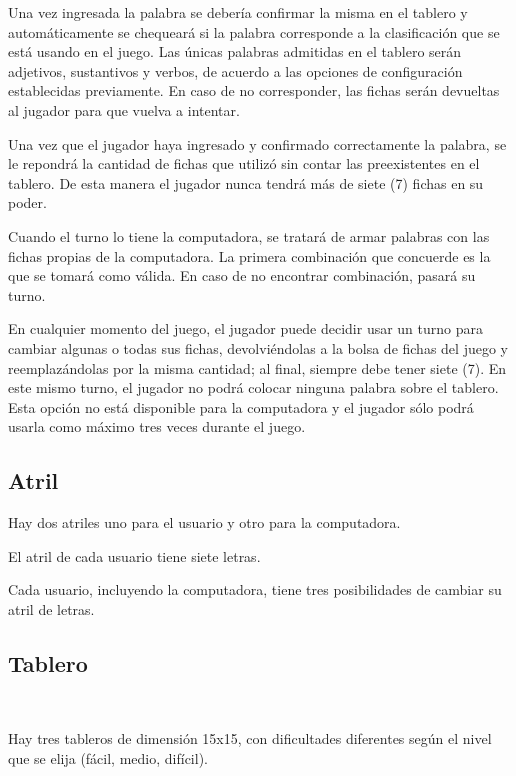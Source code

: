 \documentclass[12pt]{article}
\begin{document}
Una vez ingresada la palabra se debería confirmar la misma en el tablero y automáticamente se chequeará si la palabra corresponde a la clasificación que se está usando en el juego. Las únicas palabras admitidas en el tablero serán adjetivos, sustantivos y verbos, de acuerdo a las opciones de configuración establecidas previamente. En caso de no corresponder, las fichas serán devueltas al jugador para que vuelva a intentar.

Una vez que el jugador haya ingresado y confirmado correctamente la palabra, se le repondrá la cantidad de fichas que utilizó sin contar las preexistentes en el tablero. De esta manera el jugador nunca tendrá más de siete (7) fichas en su poder.

Cuando el turno lo tiene la computadora, se tratará de armar palabras con las fichas propias de la computadora. La primera combinación que concuerde es la que se tomará como válida. En caso de no encontrar combinación, pasará su turno.

En cualquier momento del juego, el jugador puede decidir usar un turno para cambiar algunas o todas sus fichas, devolviéndolas a la bolsa de fichas del juego y reemplazándolas por la misma cantidad; al final, siempre debe tener siete (7). En este mismo turno, el jugador no podrá colocar ninguna palabra sobre el tablero. Esta opción no está disponible para la computadora y el jugador sólo podrá usarla como máximo tres veces durante el juego.

\subsection{Atril}
  Hay dos atriles uno para el usuario y otro para la computadora.
  
  El atril de cada usuario tiene siete letras.
  
  Cada usuario, incluyendo la computadora, tiene tres posibilidades de cambiar su atril de letras.


\subsection{Tablero}

\
\


Hay tres tableros de dimensión 15x15, con dificultades diferentes según el nivel que se elija (fácil, medio, difícil).

\
\
\
\newpage
\end{document}

